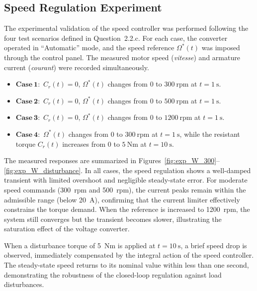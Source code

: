 \documentclass{rapportCS}
\begin{document}
\subsection{Speed Regulation Experiment}

The experimental validation of the speed controller was performed following the four test scenarios defined in Question~2.2.c. 
For each case, the converter operated in ``Automatic'' mode, and the speed reference $\Omega^*(t)$ was imposed through the control panel. 
The measured motor speed (\textit{vitesse}) and armature current (\textit{courant}) were recorded simultaneously.

\begin{itemize}
    \item $\mathbf{Case~1:}$ $C_r(t)=0$, $\Omega^*(t)$ changes from $0$ to $300~\text{rpm}$ at $t=1~\text{s}$.
    \item $\mathbf{Case~2:}$ $C_r(t)=0$, $\Omega^*(t)$ changes from $0$ to $500~\text{rpm}$ at $t=1~\text{s}$.
    \item $\mathbf{Case~3:}$ $C_r(t)=0$, $\Omega^*(t)$ changes from $0$ to $1200~\text{rpm}$ at $t=1~\text{s}$.
    \item $\mathbf{Case~4:}$ $\Omega^*(t)$ changes from $0$ to $300~\text{rpm}$ at $t=1~\text{s}$, while the resistant torque $C_r(t)$ increases from $0$ to $5~\text{Nm}$ at $t=10~\text{s}$.
\end{itemize}

The measured responses are summarized in Figures~\ref{fig:exp_W_300}--\ref{fig:exp_W_disturbance}. 
In all cases, the speed regulation shows a well-damped transient with limited overshoot and negligible steady-state error. 
For moderate speed commands (300~rpm and 500~rpm), the current peaks remain within the admissible range (below 20~A), confirming that the current limiter effectively constrains the torque demand. 
When the reference is increased to 1200~rpm, the system still converges but the transient becomes slower, illustrating the saturation effect of the voltage converter.

When a disturbance torque of 5~Nm is applied at $t=10~\text{s}$, a brief speed drop is observed, immediately compensated by the integral action of the speed controller. 
The steady-state speed returns to its nominal value within less than one second, demonstrating the robustness of the closed-loop regulation against load disturbances.
\end{document}
